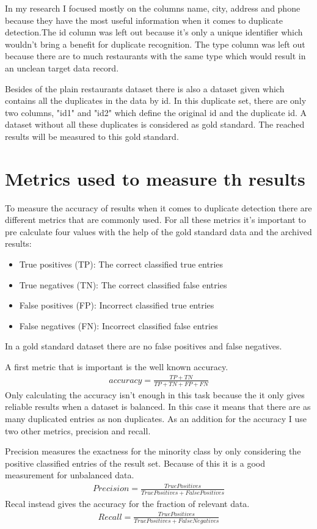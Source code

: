 \documentclass[conference]{IEEEtran}
\begin{document}
In my research I focused mostly on the columns name, city, address and phone because they have the most useful information when it comes to duplicate detection.The id column was left out because it's only a unique identifier which wouldn't bring a benefit for duplicate recognition. The type column was left out because there are to much restaurants with the same type which would result in an unclean target data record.

Besides of the plain restaurants dataset there is also a dataset given which contains all the duplicates in the data by id. In this duplicate set, there are only two columns, "id1" and "id2" which define the original id and the duplicate id. A dataset without all these duplicates is considered as gold standard. The reached results will be measured to this gold standard.
\section{Metrics used to measure th results}
To measure the accuracy of results when it comes to duplicate detection there are different metrics that are commonly used. For all these metrics it's important to pre calculate four values with the help of the gold standard data and the archived results: 
\begin{itemize}
	\item True positives (TP): The correct classified true entries
	\item True negatives (TN): The correct classified false entries
	\item False positives (FP): Incorrect classified true entries
	\item False negatives (FN): Incorrect classified false entries
\end{itemize}
In a gold standard dataset there are no false positives and false negatives.

A first metric that is important is the well known accuracy. 
\begin{align}
 accuracy =  \frac{TP + TN}{TP + TN + FP + FN}
\end{align}
Only calculating the accuracy isn't enough in this task because the it only gives reliable results when a dataset is balanced. In this case it means that there are as many duplicated entries as non duplicates. As an addition for the accuracy I use two other metrics, precision and recall.

Precision measures the exactness for the minority class by only considering the positive classified entries of the result set. Because of this it is a good measurement for unbalanced data.
\begin{align}
	Precision = \frac{TruePositives}{TruePositives + FalsePositives}
\end{align}
Recal instead gives the accuracy for the fraction of relevant data.
\begin{align}
	Recall = \frac{TruePositives}{TruePositives + FalseNegatives}
\end{align}
\end{document}
